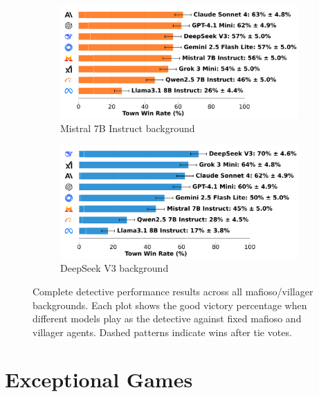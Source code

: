 \documentclass{article}
\begin{document}
\begin{figure}[htbp]
    \begin{subfigure}[b]{0.48\textwidth}
        \centering
        \includegraphics[width=\textwidth]{../results/detective_mistral_7b_instruct_v4_1_benchmark.png}
        \caption{Mistral 7B Instruct background}
        \label{fig:detective_mistral_appendix}
    \end{subfigure}
    \hfill
    \begin{subfigure}[b]{0.48\textwidth}
        \centering
        \includegraphics[width=\textwidth]{../results/detective_deepseek_v3_v4_1_benchmark.png}
        \caption{DeepSeek V3 background}
        \label{fig:detective_deepseek_appendix}
    \end{subfigure}
    \caption{Complete detective performance results across all mafioso/villager backgrounds. Each plot shows the good victory percentage when different models play as the detective against fixed mafioso and villager agents. Dashed patterns indicate wins after tie votes.}
    \label{fig:detective_complete}
\end{figure}

\section{Exceptional Games}
\label{appendix:exceptional_games}
\end{document}
